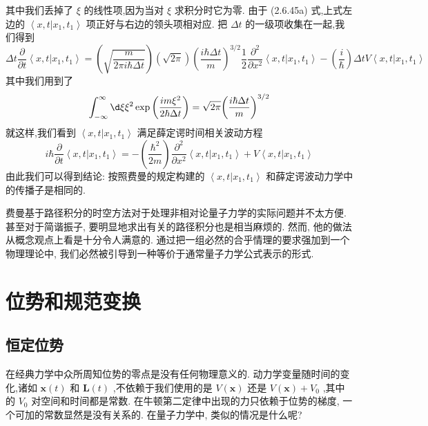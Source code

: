 其中我们丢掉了 $\xi$ 的线性项,因为当对 $\xi$ 求积分时它为零. 由于 (2.6.45a) 式,上式左边的 $\left\langle {x, t | {x}_{1},{t}_{1}}\right\rangle$ 项正好与右边的领头项相对应. 把 ${\Delta t}$ 的一级项收集在一起,我们得到
\begin{equation}
{\Delta t}\frac{\partial }{\partial t}\left\langle {x, t | {x}_{1},{t}_{1}}\right\rangle = \left( \sqrt{\frac{m}{{2\pi i}\hbar {\Delta t}}}\right) \left( \sqrt{2\pi }\right) {\left( \frac{i\hbar {\Delta t}}{m}\right) }^{3/2}\frac{1}{2}\frac{{\partial }^{2}}{\partial {x}^{2}}\left\langle {x, t | {x}_{1},{t}_{1}}\right\rangle- \left( \frac{i}{\hbar }\right) {\Delta tV}\left\langle {x, t | {x}_{1},{t}_{1}}\right\rangle
\end{equation}
其中我们用到了
\begin{equation}
\int_{-\infty }^{\infty }{\d \xi }{\xi }^{2}\exp \left( \frac{{im}{\xi }^{2}}{2\hbar {\Delta t}}\right) = \sqrt{2\pi }{\left( \frac{i\hbar {\Delta t}}{m}\right) }^{3/2}
\end{equation}
就这样,我们看到 $\left\langle {x, t | {x}_{1},{t}_{1}}\right\rangle$ 满足薛定谔时间相关波动方程
\begin{equation}
i\hbar \frac{\partial }{\partial t}\left\langle {x, t | {x}_{1},{t}_{1}}\right\rangle = - \left( \frac{{\hbar }^{2}}{2m}\right) \frac{{\partial }^{2}}{\partial {x}^{2}}\left\langle {x, t | {x}_{1},{t}_{1}}\right\rangle + V\left\langle {x, t | {x}_{1},{t}_{1}}\right\rangle
\end{equation}
由此我们可以得到结论: 按照费曼的规定构建的 $\left\langle {x, t | {x}_{1},{t}_{1}}\right\rangle$ 和薛定谔波动力学中的传播子是相同的.

费曼基于路径积分的时空方法对于处理非相对论量子力学的实际问题并不太方便. 甚至对于简谐振子, 要明显地求出有关的路径积分也是相当麻烦的. 然而, 他的做法从概念观点上看是十分令人满意的. 通过把一组必然的合乎情理的要求强加到一个物理理论中, 我们必然被引导到一种等价于通常量子力学公式表示的形式. 
\section{位势和规范变换}
\subsection{恒定位势}
在经典力学中众所周知位势的零点是没有任何物理意义的. 动力学变量随时间的变化,诸如 $\mathbf{x}\left( t\right)$ 和 $\mathbf{L}\left( t\right)$ ,不依赖于我们使用的是 $V\left( \mathbf{x}\right)$ 还是 $V\left( \mathbf{x}\right) + {V}_{0}$ ,其中的 ${V}_{0}$ 对空间和时间都是常数. 在牛顿第二定律中出现的力只依赖于位势的梯度, 一个可加的常数显然是没有关系的. 在量子力学中, 类似的情况是什么呢?

